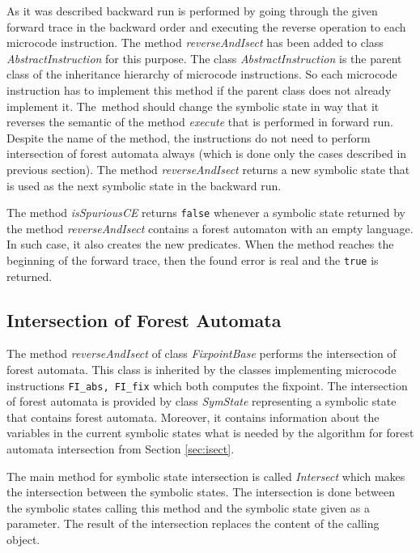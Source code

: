 As it was described backward run is performed by going through the given
forward trace in the backward order and executing the reverse operation to each
microcode instruction.
The method \emph{reverseAndIsect} has been added to class \emph{AbstractInstruction}
for this purpose.
The class \emph{AbstractInstruction} is the parent class of the inheritance hierarchy of
microcode instructions.
So each microcode instruction has to implement this method if the parent class does not
already implement it.
The~method should change the symbolic state in way that it reverses the semantic of
the method \emph{execute} that is performed in forward run.
Despite the name of the method, the instructions do not need to perform
intersection of forest automata always (which is done only the cases described in
previous section).
The method \emph{reverseAndIsect} returns a new symbolic state that
is used as the next symbolic state in the backward run.

The method \emph{isSpuriousCE} returns {\tt false} whenever
a symbolic state returned by the method \emph{reverseAndIsect}
contains a forest automaton with an empty language.
In such case, it also  creates the new predicates.
When the method reaches the beginning of the forward
trace, then the found error is real and the {\tt true}
is returned.

\subsection{Intersection of Forest Automata}
\label{subsec:isectimpl}

The method \emph{reverseAndIsect} of class \emph{FixpointBase}
performs the intersection of forest automata.
This class is inherited by the classes implementing microcode
instructions {\tt FI\_abs, FI\_fix} which both computes the fixpoint.
The intersection of forest automata is provided by class \emph{SymState}
representing a symbolic state that contains forest automata.
Moreover, it contains information about the variables in the current
symbolic states what is needed by the algorithm for forest automata intersection
from Section \ref{sec:isect}.

The main method for symbolic state intersection is called \emph{Intersect}
which makes the intersection between the symbolic states.
The intersection is done between the symbolic states calling
this method and the symbolic state given as a parameter.
The result of the intersection replaces the content of the calling object.

